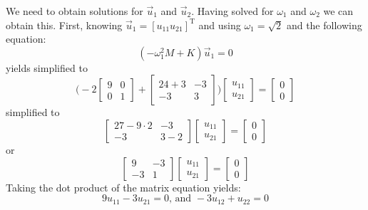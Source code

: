 \documentclass[12pt,letter]{article}
\begin{document}
\begin{example}
	We need to obtain solutions for $\vec{u}_1$ and $\vec{u}_2$. Having solved for $\omega_1$ and $\omega_2$ we can obtain this. First, knowing $\vec{u}_1 = [u_{11} u_{21}]^\text{T}$ and using $\omega_1 = \sqrt{2}$ and the following equation:
	\begin{equation}
		(-\omega_1^2 M  + K)\vec{u}_1 =0
	\end{equation}
	yields
	simplified to
	\begin{equation}
		 \bigg(-2\begin{bmatrix} 9 & 0 \\   0  & 1 \end{bmatrix} + \begin{bmatrix} 24+3 & -3 \\    -3  & 3 \end{bmatrix}\bigg)\begin{bmatrix} u_{11}\\ u_{21}\end{bmatrix} = \begin{bmatrix} 0\\ 0\end{bmatrix}
	\end{equation}
	simplified to
	\begin{equation}
		 \begin{bmatrix} 27-9\cdot 2 & -3 \\    -3  & 3-2 \end{bmatrix} 
		 \begin{bmatrix} u_{11}\\ u_{21}\end{bmatrix}=\begin{bmatrix} 0\\ 0\end{bmatrix}
	\end{equation}
	or
	\begin{equation}
		 \begin{bmatrix} 9 & -3 \\    -3  & 1 \end{bmatrix} 
		 \begin{bmatrix} u_{11}\\ u_{21}\end{bmatrix}=\begin{bmatrix} 0\\ 0\end{bmatrix}
	\end{equation}
	Taking the dot product of the matrix equation yields:
	\begin{equation}
		9u_{11} -3u_{21}=0 \text{, and } -3u_{12} + u_{22}=0

\end{equation}
\end{example}
\end{document}
